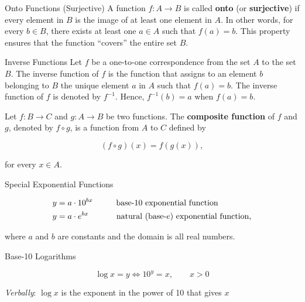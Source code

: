 \begin{definition}{Onto Functions (Surjective)}
A function \( f: A \rightarrow B \) is called \textbf{onto} (or \textbf{surjective}) if every element in \( B \) is the image of at least one element in \( A \). In other words, for every \( b \in B \), there exists at least one \( a \in A \) such that \( f(a) = b \). This property ensures that the function ``covers'' the entire set \( B \).
\end{definition}

\begin{definition}{Inverse Functions}
Let $f$ be a one-to-one correspondence from the set $A$ to the set $B$. The inverse function of $f$ is the function that assigns to an element $b$ belonging to $B$ the unique element $a$ in $A$ such that $f(a)=b$. The inverse function of $f$ is denoted by $f^{-1}$. Hence, $f^{-1}(b)=a$ when $f(a)=b$.    
\end{definition}

\begin{definition}
    

Let \( f: B \rightarrow C \) and \( g: A \rightarrow B \) be two functions. The \textbf{composite function} of \( f \) and \( g \), denoted by \( f \circ g \), is a function from \( A \) to \( C \) defined by

\[
(f \circ g)(x) = f(g(x)),
\]

for every \( x \in A \).

\end{definition}

\begin{definition}{Special Exponential Functions}

\begin{align*}
y &= a \cdot 10^{bx} \hspace{1cm} \text{base-10 exponential function} \\
y &= a \cdot e^{bx}  \hspace{1.2cm} \text{natural (base-}e\text{) exponential function,}
\end{align*}

where $a$ and $b$ are constants and the domain is all real numbers.
    
\end{definition}

\begin{definition}{Base-10 Logarithms}

\[
\log x=y \iff 10^y=x, \qquad x>0
\]

\textit{Verbally}: $\log x$ is the exponent in the power of 10 that gives $x$   
\end{definition}

